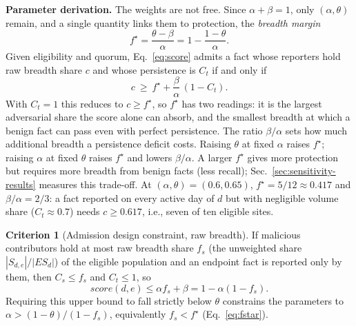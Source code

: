 \documentclass[journal]{IEEEtran}
\theoremstyle{definition}
\newtheorem{criterion}{Criterion}
\begin{document}
\textbf{Parameter derivation.} The weights are not free. Since $\alpha+\beta=1$, only $(\alpha,\theta)$ remain, and a single quantity links them to protection, the \emph{breadth margin}
\begin{equation}
f^\star=\frac{\theta-\beta}{\alpha}=1-\frac{1-\theta}{\alpha}.
\label{eq:fstar}
\end{equation}
Given eligibility and quorum, Eq.~\ref{eq:score} admits a fact whose reporters hold raw breadth share $c$ and whose persistence is $C_t$ if and only if
\begin{equation}
c\ \ge\ f^\star+\frac{\beta}{\alpha}\,(1-C_t).
\label{eq:benignbreadth}
\end{equation}
With $C_t=1$ this reduces to $c\ge f^\star$, so $f^\star$ has two readings: it is the largest adversarial share the score alone can absorb, and the smallest breadth at which a benign fact can pass even with perfect persistence. The ratio $\beta/\alpha$ sets how much additional breadth a persistence deficit costs. Raising $\theta$ at fixed $\alpha$ raises $f^\star$; raising $\alpha$ at fixed $\theta$ raises $f^\star$ and lowers $\beta/\alpha$. A larger $f^\star$ gives more protection but requires more breadth from benign facts (less recall); Sec.~\ref{sec:sensitivity-results} measures this trade-off. At $(\alpha,\theta)=(0.6,0.65)$, $f^\star=5/12\approx0.417$ and $\beta/\alpha=2/3$: a fact reported on every active day of $d$ but with negligible volume share ($C_t\approx0.7$) needs $c\ge0.617$, i.e., seven of ten eligible sites.

\begin{criterion}[Admission design constraint, raw breadth]
\label{crit:poison-bound}
If malicious contributors hold at most raw breadth share $f_s$ (the unweighted share $|S_{d,e}|/|ES_d|$) of the eligible population and an endpoint fact is reported only by them, then $C_s\le f_s$ and $C_t\le1$, so
\begin{equation}
score(d,e)\le\alpha f_s+\beta
=1-\alpha(1-f_s).
\label{eq:poisonbound}
\end{equation}
Requiring this upper bound to fall strictly below $\theta$ constrains the parameters to $\alpha>(1-\theta)/(1-f_s)$, equivalently $f_s<f^\star$ (Eq.~\ref{eq:fstar}).
\end{criterion}
\end{document}
